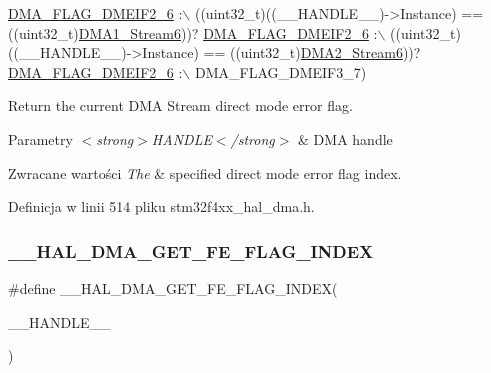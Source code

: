 \begin{DoxyCode}
      \hyperlink{group___d_m_a__flag__definitions_ga8963d8e64fa5610d7617d8fe81c76704}{DMA\_FLAG\_DMEIF2\_6} :\(\backslash\)
 ((uint32\_t)((\_\_HANDLE\_\_)->Instance) == ((uint32\_t)\hyperlink{group___peripheral__declaration_gac95127480470900755953f1cfe68567d}{DMA1\_Stream6}))? 
      \hyperlink{group___d_m_a__flag__definitions_ga8963d8e64fa5610d7617d8fe81c76704}{DMA\_FLAG\_DMEIF2\_6} :\(\backslash\)
 ((uint32\_t)((\_\_HANDLE\_\_)->Instance) == ((uint32\_t)\hyperlink{group___peripheral__declaration_ga11a00b283e0911cd427e277e5a314ccc}{DMA2\_Stream6}))? 
      \hyperlink{group___d_m_a__flag__definitions_ga8963d8e64fa5610d7617d8fe81c76704}{DMA\_FLAG\_DMEIF2\_6} :\(\backslash\)
   DMA\_FLAG\_DMEIF3\_7)
\end{DoxyCode}


Return the current D\+MA Stream direct mode error flag. 


\begin{DoxyParams}{Parametry}
{\em $<$strong$>$\+H\+A\+N\+D\+L\+E$<$/strong$>$} & D\+MA handle \\
\hline
\end{DoxyParams}

\begin{DoxyRetVals}{Zwracane wartości}
{\em The} & specified direct mode error flag index. \\
\hline
\end{DoxyRetVals}


Definicja w linii 514 pliku stm32f4xx\+\_\+hal\+\_\+dma.\+h.

\mbox{\label{group___d_m_a_ga5878c3a1dbcf01e6840fffcf1f244088}} 
\subsubsection{\texorpdfstring{\+\_\+\+\_\+\+H\+A\+L\+\_\+\+D\+M\+A\+\_\+\+G\+E\+T\+\_\+\+F\+E\+\_\+\+F\+L\+A\+G\+\_\+\+I\+N\+D\+EX}{\_\_HAL\_DMA\_GET\_FE\_FLAG\_INDEX}}
{\footnotesize\ttfamily \#define \+\_\+\+\_\+\+H\+A\+L\+\_\+\+D\+M\+A\+\_\+\+G\+E\+T\+\_\+\+F\+E\+\_\+\+F\+L\+A\+G\+\_\+\+I\+N\+D\+EX(\begin{DoxyParamCaption}\item[{}]{\+\_\+\+\_\+\+H\+A\+N\+D\+L\+E\+\_\+\+\_\+ }\end{DoxyParamCaption})}

